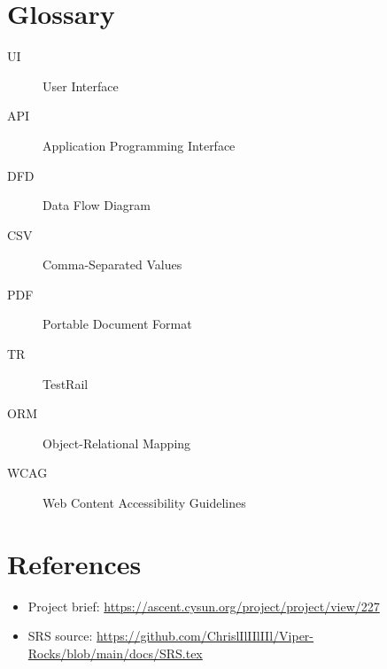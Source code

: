 \documentclass{article}
\begin{document}
\section{Glossary}
\begin{description}
  \item[UI] User Interface
  \item[API] Application Programming Interface
  \item[DFD] Data Flow Diagram
  \item[CSV] Comma-Separated Values
  \item[PDF] Portable Document Format
  \item[TR] TestRail
  \item[ORM] Object-Relational Mapping
  \item[WCAG] Web Content Accessibility Guidelines
\end{description}

\section{References}
\begin{itemize}
  \item Project brief: \url{https://ascent.cysun.org/project/project/view/227}
  \item SRS source: \url{https://github.com/ChrislIlIIlIIl/Viper-Rocks/blob/main/docs/SRS.tex}
\end{itemize}
\end{document}
